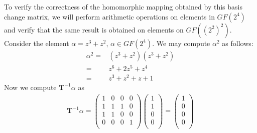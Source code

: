 To verify the correctness of the homomorphic mapping obtained by this basis change matrix, we will perform arithmetic operations on elements in $GF(2^4)$ and verify that the same result is obtained on elements on $GF((2^2)^2)$. Consider the element $\alpha = z^3 + z^2$, $\alpha \in GF(2^4)$. We may compute $\alpha^2$ as follows:
\begin{align*}
\alpha^2 = & (z^3 + z^2)(z^3 + z^2) \\
= & z^6 + 2z^5 + z^4 \\
= & z^3 + z^2 + z + 1
\end{align*}
Now we compute $\mathbf{T}^{-1}\alpha$ as 
\begin{align*}
\mathbf{T}^{-1}\alpha = 
\begin{pmatrix}
1 & 0 & 0 & 0 \\
1 & 1 & 1 & 0 \\
1 & 1 & 0 & 0 \\
0 & 0 & 0 & 1 \\
\end{pmatrix}
\begin{pmatrix}
1\\
1\\
0\\
0\\
\end{pmatrix} = 
\begin{pmatrix}
1\\
0\\
0\\
0\\
\end{pmatrix}
\end{align*}

